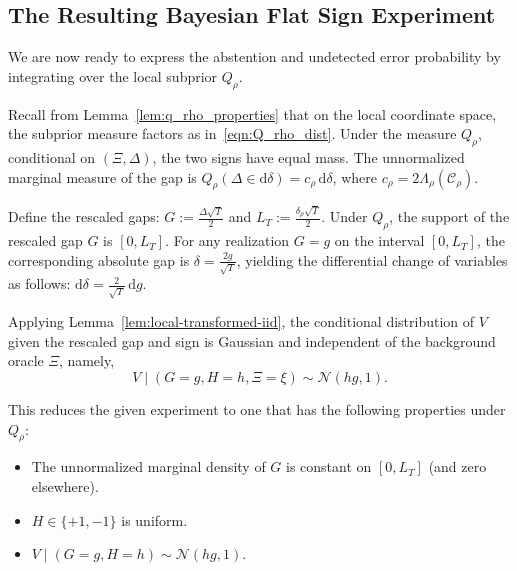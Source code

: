 \documentclass[10pt]{article}
\newcommand{\dd}{\mathrm{d}}
\theoremstyle{plain}
\begin{document}
\subsection{The Resulting Bayesian Flat Sign Experiment}
\label{subsec:flat-sign-experiment}

We are now ready to  express the abstention and undetected error probability by integrating over the local subprior $Q_\rho$. 

Recall from Lemma~\ref{lem:q_rho_properties} that on the local coordinate space, the subprior measure factors as in~\eqref{eqn:Q_rho_dist}.
Under the  measure $Q_\rho$, conditional on $(\Xi,\Delta)$, the two signs have equal mass. The unnormalized marginal measure of the gap is $Q_\rho(\Delta\in \dd\delta) = c_\rho\,\dd\delta$, where $c_\rho = 2\Lambda_\rho(\mathcal{C}_\rho)$.

Define the  rescaled gaps:
$G := \frac{\Delta\sqrt{T}}{2}$ and $L_T := \frac{\delta_{\rho}\sqrt{T}}{2}$.
Under $Q_\rho$, the support of the rescaled gap $G$ is  $[0, L_T]$. For any realization $G=g$ on the interval $[0, L_T]$, the corresponding absolute gap is $\delta = \frac{2g}{\sqrt{T}}$, yielding the differential change of variables as follows:
$\dd\delta = \frac{2}{\sqrt{T}}\,\dd g.$

Applying Lemma~\ref{lem:local-transformed-iid}, the conditional distribution of $V$ given the rescaled gap and sign is Gaussian and independent of the background oracle $\Xi$, namely, 
\begin{equation}
V \mid (G=g, H=h, \Xi=\xi) \sim \mathcal{N}(hg, 1).
\end{equation}


This reduces the given experiment to one that has the following properties under $Q_\rho$:
\begin{itemize}
    \item The unnormalized marginal density of $G$ is constant on $[0, L_T]$ (and zero elsewhere).
    \item $H \in \{+1, -1\}$ is uniform.
    \item $V \mid (G=g, H=h) \sim \mathcal{N}(hg, 1)$.
\end{itemize}
\end{document}
